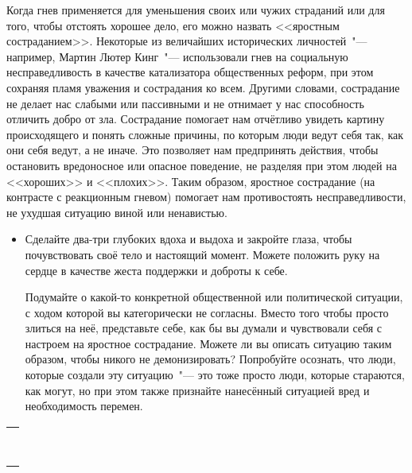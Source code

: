 Когда гнев применяется для уменьшения своих или чужих страданий или для того, чтобы отстоять хорошее дело, его можно назвать <<яростным состраданием>>. Некоторые из величайших исторических личностей~"--- например, Мартин Лютер Кинг~"--- использовали гнев на социальную несправедливость в качестве катализатора общественных реформ, при этом сохраняя пламя уважения и сострадания ко всем. Другими словами, сострадание не делает нас слабыми или пассивными и не отнимает у нас способность отличить добро от зла. Сострадание помогает нам отчётливо увидеть картину происходящего и понять сложные причины, по которым люди ведут себя так, как они себя ведут, а не иначе. Это позволяет нам предпринять действия, чтобы остановить вредоносное или опасное поведение, не разделяя при этом людей на <<хороших>> и <<плохих>>. Таким образом, яростное сострадание (на контрасте с реакционным гневом) помогает нам противостоять несправедливости, не ухудшая ситуацию виной или ненавистью.
\begin{itemize}
	\item Сделайте два-три глубоких вдоха и выдоха и закройте глаза, чтобы почувствовать своё тело и настоящий момент. Можете положить руку на сердце в качестве жеста поддержки и доброты к себе.
	
	\itemWritingHand Подумайте о какой-то конкретной общественной или политической ситуации, с ходом которой вы категорически не согласны. Вместо того чтобы просто злиться на неё, представьте себе, как бы вы думали и чувствовали себя с настроем на яростное сострадание. Можете ли вы описать ситуацию таким образом, чтобы никого не демонизировать? Попробуйте осознать, что люди, которые создали эту ситуацию~"--- это тоже просто люди, которые стараются, как могут, но при этом также признайте нанесённый ситуацией вред и необходимость перемен.
\end{itemize}
\setlength{\extrarowheight}{2mm}
\begin{tabularx}{\textwidth}{X}
	\\
	\arrayrulecolor{gray}\hline\\
	\hline\\
	\hline\\
	\hline\\
	\hline\\
	\hline\\	
	\hline\\
	\hline\\
	\hline\\
\end{tabularx}
\setlength{\extrarowheight}{0mm}
